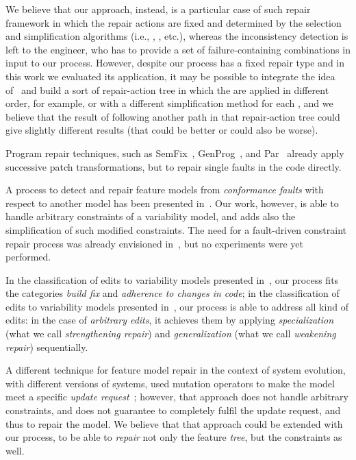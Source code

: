 \begin{tikzborder}{\cite{Gargantini16:validation}}
\begin{tikzborder}{\cite{gargantini_combinatorial_2017}}
\begin{tikzborder}{\cite{garn2019}}
\begin{tikzborder}{\cite{arcaini2019achieving}}
\begin{tikzborder}{\cite{arcaini2019varivolution}}
		We believe that our approach, instead, is a particular case of such repair framework in which the repair actions are fixed and determined by the selection and simplification algorithms (i.e., \espresso, \qm, etc.), whereas the inconsistency detection is left to the engineer, who has to provide a set of failure-containing combinations in input to our process. However, despite our process has a fixed repair type and in this work we evaluated its application, it may be possible to integrate the idea of~\cite{reder_computing_2012} and build a sort of repair-action tree in which the \fccs are applied in different order, for example, or with a different simplification method for each \fcc, and we believe that the result of following another path in that repair-action tree could give slightly different results (that could be better or could also be worse).
		
		\bb
		Program repair techniques, such as SemFix~\cite{Nguyen_2013}, GenProg~\cite{le_goues_systematic_2012}, and Par~\cite{kim_automatic_2013} already apply successive patch transformations, but to repair single faults in the code directly.
		
		A process to detect and repair feature models from \textit{conformance faults} with respect to another model has been presented in~\cite{icst2016}. Our work, however, is able to handle arbitrary constraints of a variability model, and adds also the simplification of such modified constraints. The need for a fault-driven constraint repair process was already envisioned in~\cite{henard_towards_2013}, but no experiments were yet performed.
		
		In the classification of edits to variability models presented in~\cite{lotufo_evolution_2010}, our process fits the categories \textit{build fix} and \textit{adherence to changes in code}; in the classification of edits to variability models presented in~\cite{thum_reasoning_2009}, our process is able to address all kind of edits: in the case of {\it arbitrary edits}, it achieves them by applying \textit{specialization} (what we call \textit{strengthening repair}) and \textit{generalization} (what we call \textit{weakening repair}) sequentially.
		
		A different technique for feature model repair in the context of system evolution, with different versions of systems, used mutation operators to make the model meet a specific \textit{update request}~\cite{arcaini2019achieving,arcaini_evolutionary_2018}; however, that approach does not handle arbitrary constraints, and does not guarantee to completely fulfil the update request, and thus to repair the model. We believe that that approach could be extended with our process, to be able to \textit{repair} not only the feature \textit{tree}, but the constraints as well.
		

\end{tikzborder}
\end{tikzborder}
\end{tikzborder}
\end{tikzborder}
\end{tikzborder}
